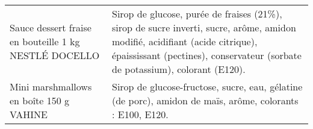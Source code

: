 \begin{longtable}{p{5cm}p{10cm}}
                                                    Sauce dessert fraise en bouteille 1 kg NESTLÉ DOCELLO &                                                                                                                                                                                                                                                                                                                                                                                                                                                                                                                                                                                                                                                                                                                                                                                                                              Sirop de glucose, purée de fraises (21\%), sirop de sucre inverti, sucre, arôme, amidon modifié, acidifiant (acide citrique), épaississant (pectines), conservateur (sorbate de potassium), colorant (E120). \\
                                                                  Mini marshmallows en boîte 150 g VAHINE &                                                                                                                                                                                                                                                                                                                                                                                                                                                                                                                                                                                                                                                                                                                                                                                                                                                                                                                                Sirop de glucose-fructose, sucre, eau, gélatine (de porc), amidon de maïs, arôme, colorants : E100, E120. \\

\end{longtable}
